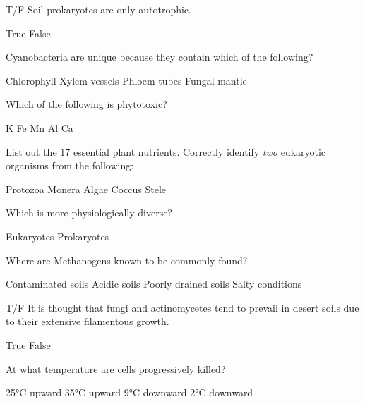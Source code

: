 \documentclass[12pt]{exam}
\begin{document}
\begin{questions}
\question T/F Soil prokaryotes are only autotrophic.

\begin{oneparchoices}
 \choice True %
 \choice False
\end{oneparchoices}

\question Cyanobacteria are unique because they contain which of the following?

\begin{oneparchoices}
 \choice Chlorophyll %
 \choice Xylem vessels
 \choice Phloem tubes
 \choice Fungal mantle
\end{oneparchoices}
\newpage
\question Which of the following is phytotoxic?

\begin{oneparchoices}
 \choice K
 \choice Fe
 \choice Mn
 \choice Al %
 \choice Ca
\end{oneparchoices}

\question List out the 17 essential plant nutrients.
\vspace{1in}
\question Correctly identify \emph{two} eukaryotic organisms from the following:

\begin{oneparchoices}
 \choice Protozoa %
 \choice Monera
 \choice Algae %
 \choice Coccus
 \choice Stele
\end{oneparchoices}

\question Which is more physiologically diverse?

\begin{oneparchoices}
 \choice Eukaryotes
 \choice Prokaryotes %
\end{oneparchoices}

\question Where are Methanogens known to be commonly found?

\begin{oneparchoices}
    \choice Contaminated soils
    \choice Acidic soils
    \choice Poorly drained soils %
    \choice Salty conditions
\end{oneparchoices}

\question T/F It is thought that fungi and actinomycetes tend to prevail in desert soils due to their extensive filamentous growth.

\begin{oneparchoices}
 \choice True %
 \choice False
\end{oneparchoices}

\question At what temperature are cells progressively killed?

\begin{oneparchoices}
 \choice \ang{25}C upward
 \choice \ang{35}C upward %
 \choice \ang{9}C downward
 \choice \ang{2}C downward
\end{oneparchoices}
\end{questions}
\end{document}

